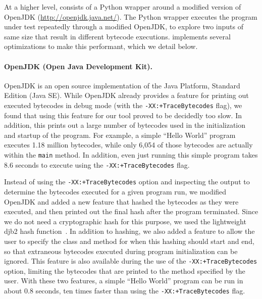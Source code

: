 At a higher level, \jcupid consists of a Python wrapper around a modified
version of OpenJDK (\url{http://openjdk.java.net/}). 
The Python wrapper executes the program under test repeatedly through a modified
OpenJDK, to explore two inputs of same size that result in different bytecode
executions.
\jcupid implements several optimizations to make this performant, which we
detail below. 

\paragraph{OpenJDK (Open Java Development Kit).}
\label{sec:OpenJDK}
OpenJDK is an open source implementation of the Java Platform, Standard Edition
(Java SE). 
While OpenJDK already provides a feature for printing out executed bytecodes in
debug mode (with the \texttt{-XX:+TraceBytecodes} flag), we found that using
this feature for our tool proved to be decidedly too slow. In addition,
this prints out a large number of bytecodes used in the initialization and
startup of the program. For example, a simple ``Hello World'' program executes
1.18 million bytecodes, while only 6,054 of those bytecodes are actually within
the \texttt{main} method. In addition, even just running this simple program
takes 8.6 seconds to execute using the \texttt{-XX:+TraceBytecodes} flag.

Instead of using the \texttt{-XX:+TraceBytecodes} option and inspecting the
output to determine the bytecodes executed for a given program run, we modified
OpenJDK and added a new feature that hashed the bytecodes as they were executed,
and then printed out the final hash after the program terminated.
Since we do not need a cryptographic hash for this purpose, we used the
lightweight djb2 hash function~\cite{djb2Hash}.
In addition to hashing, we also added a feature to allow the user
to specify the class and method for when this hashing should start and end, so
that extraneous bytecodes executed during program initialization can be ignored.
This feature is also available during the use of the
\texttt{-XX:+TraceBytecodes} option, limiting the bytecodes that are printed to
the method specified by the user. With these two features, a simple ``Hello
World'' program can be run in about 0.8 seconds, ten times faster than using
the \texttt{-XX:+TraceBytecodes} flag.

